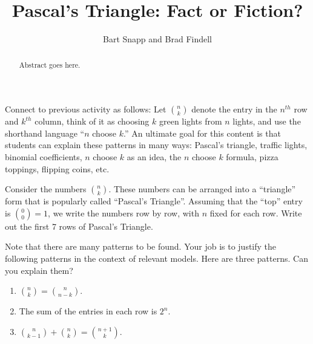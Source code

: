 \documentclass{ximera}
\title{Pascal's Triangle: Fact or Fiction?}
\author{Bart Snapp and Brad Findell}
\begin{document}
\begin{abstract}
Abstract goes here.  
\end{abstract}
\maketitle

\label{A:factOrFiction}

\begin{teachingnote}
Connect to previous activity as follows:  Let $\binom{n}{k}$ denote the entry in the $n^{th}$ row and $k^{th}$ column, think of it as choosing $k$ green lights from $n$ lights, and use the shorthand language ``$n$ choose $k$.''  An ultimate goal for this content is that students can explain these patterns in many ways: Pascal's triangle, traffic lights, binomial coefficients, $n$ choose $k$ as an idea, the $n$ choose $k$ formula, pizza toppings, flipping coins, etc.
\end{teachingnote}
\begin{problem}
Consider the numbers $\binom{n}{k}$.  These numbers can be arranged
into a ``triangle'' form that is popularly called ``Pascal's
Triangle''.  Assuming that the ``top'' entry is $\binom{0}{0}=1$, we
write the numbers row by row, with $n$ fixed for each row.  Write out
the first 7 rows of Pascal's Triangle.

\vspace{3in}


Note that there are many patterns to be found.  Your job is to justify
the following patterns in the context of relevant models. Here are three patterns.  Can you explain them?
\begin{enumerate}
\item $\binom{n}{k} = \binom{n}{n-k}$.
\item The sum of the entries in each row is $2^n$.
\item $\binom{n}{k-1} + \binom{n}{k} = \binom{n+1}{k}$.
\end{enumerate}
\end{problem}
\end{document}
